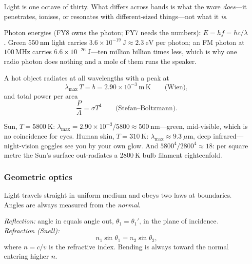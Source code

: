 Light is one octave of thirty. What differs across bands is what the wave \emph{does}---it penetrates, ionises, or resonates with different-sized things---not what it \emph{is}.

Photon energies (FY8 owns the photon; FY7 needs the numbers): $E = hf = hc/\lambda$. Green $550\ \mathrm{nm}$ light carries $3.6\times 10^{-19}\ \mathrm{J} \approx 2.3\ \mathrm{eV}$ per photon; an FM photon at $100\ \mathrm{MHz}$ carries $6.6\times 10^{-26}\ \mathrm{J}$---ten million billion times less, which is why one radio photon does nothing and a mole of them runs the speaker.

\begin{theorem}\label{thm:blackbody}
A hot object radiates at all wavelengths with a peak at
\begin{equation}\label{eq:wien}
  \lambda_\text{max}\,T = b = 2.90\times 10^{-3}\ \mathrm{m\,K} \qquad\text{(Wien)},
\end{equation}
and total power per area
\begin{equation}\label{eq:stefan}
  \frac{P}{A} = \sigma T^4 \qquad\text{(Stefan--Boltzmann)}.
\end{equation}
\end{theorem}

\begin{example}\label{exm:blackbody}
Sun, $T = 5800\ \mathrm{K}$: $\lambda_\text{max} = 2.90\times 10^{-3}/5800 \approx 500\ \mathrm{nm}$---green, mid-visible, which is no coincidence for eyes. Human skin, $T = 310\ \mathrm{K}$: $\lambda_\text{max} \approx 9.3\ \mu\mathrm{m}$, deep infrared---night-vision goggles see you by your own glow. And $5800^4/2800^4 \approx 18$: per square metre the Sun's surface out-radiates a $2800\ \mathrm{K}$ bulb filament eighteenfold.
\end{example}

\subsubsection{Geometric optics}

Light travels straight in uniform medium and obeys two laws at boundaries. Angles are always measured from the \emph{normal}.

\begin{theorem}\label{thm:snell}
\emph{Reflection:} angle in equals angle out, $\theta_1 = \theta_1'$, in the plane of incidence. \emph{Refraction (Snell):}
\begin{equation}\label{eq:snell}
  n_1\sin\theta_1 = n_2\sin\theta_2,
\end{equation}
where $n = c/v$ is the refractive index. Bending is always toward the normal entering higher $n$.
\end{theorem}

